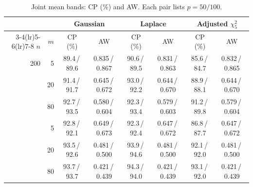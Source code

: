 \begin{table}[!tbp]
\centering
\caption{Joint mean bands: CP (\%) and AW. Each pair lists $p=50/100$.}
\label{tab:highd-mean}
\renewcommand{\baselinestretch}{1}\footnotesize
\setlength{\tabcolsep}{3pt}
\renewcommand{\arraystretch}{1.08}
\begin{tabular}{@{}rr*{3}{cc}@{}}
\toprule
& & \multicolumn{2}{c}{Gaussian} & \multicolumn{2}{c}{Laplace} & \multicolumn{2}{c}{Adjusted $\chi^2_5$}\\
\cmidrule(lr){3-4}\cmidrule(lr){5-6}\cmidrule(lr){7-8}
$n$ & $m$ & CP (\%) & AW & CP (\%) & AW & CP (\%) & AW\\
\midrule
200 & 5 & 89.4\,/\,89.6 & 0.835\,/\,0.867 & 90.6\,/\,89.5 & 0.831\,/\,0.863 & 85.6\,/\,84.7 & 0.832\,/\,0.865\\
 & 20 & 91.4\,/\,91.7 & 0.645\,/\,0.672 & 93.0\,/\,92.2 & 0.644\,/\,0.670 & 88.9\,/\,88.1 & 0.644\,/\,0.670\\
 & 80 & 92.7\,/\,93.5 & 0.580\,/\,0.604 & 92.3\,/\,93.4 & 0.579\,/\,0.603 & 91.2\,/\,89.8 & 0.579\,/\,0.604\\
\addlinespace[3pt]
400 & 5 & 92.8\,/\,92.1 & 0.649\,/\,0.673 & 92.3\,/\,92.4 & 0.647\,/\,0.672 & 86.8\,/\,87.7 & 0.647\,/\,0.672\\
 & 20 & 93.5\,/\,92.6 & 0.481\,/\,0.500 & 93.9\,/\,94.6 & 0.481\,/\,0.500 & 92.1\,/\,92.0 & 0.481\,/\,0.500\\
 & 80 & 93.7\,/\,93.7 & 0.421\,/\,0.439 & 94.3\,/\,94.0 & 0.421\,/\,0.439 & 93.1\,/\,92.0 & 0.421\,/\,0.439\\
\bottomrule
\end{tabular}
\end{table}
